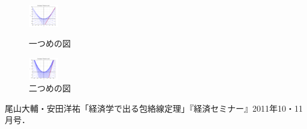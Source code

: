 \documentclass[11pt,a4j,fleqn]{jarticle}
\begin{document}
\begin{figure}[b]
 \begin{minipage}{0.5\hsize}
  \begin{center}
   \includegraphics[width=13mm]{envelope0.pdf}
  \end{center}
  \caption{一つめの図}
  \label{fig:one}
 \end{minipage}
 \begin{minipage}{0.4\hsize}
  \begin{center}
   \includegraphics[width=13mm]{envelope1.pdf}
  \end{center}
  \caption{二つめの図}
  \label{fig:two}
 \end{minipage}
\end{figure}


\begin{thebibliography}{0}
尾山大輔・安田洋祐「経済学で出る包絡線定理」『経済セミナー』2011年10・11月号．

\end{thebibliography}
\end{document}
